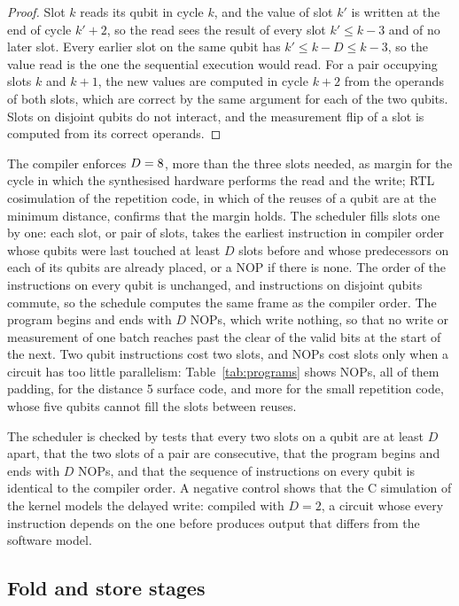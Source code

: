 \begin{proof}
Slot $k$ reads its qubit in cycle $k$, and the value of slot $k'$ is written at the end of cycle $k'+2$, so the read
sees the result of every slot $k'\le k-3$ and of no later slot. Every earlier slot on the same qubit has $k'\le k-D\le
k-3$, so the value read is the one the sequential execution would read. For a pair occupying slots $k$ and $k+1$, the
new values are computed in cycle $k+2$ from the operands of both slots, which are correct by the same argument for
each of the two qubits. Slots on disjoint qubits do not interact, and the measurement flip of a slot is computed from
its correct operands.
\end{proof}

The compiler enforces $D=8$, more than the three slots needed, as margin for the cycle in which the
synthesised hardware performs the read and the write; RTL cosimulation of the repetition code, in which \NumRepReusesAtD{} of the \NumRepReuses{} reuses
of a qubit are at the minimum distance, confirms that the margin holds. The scheduler fills slots one by one: each slot, or pair of
slots, takes the earliest instruction in compiler order whose qubits were last touched at least $D$ slots before and
whose predecessors on each of its qubits are already placed, or a NOP if there is none. The order of the instructions
on every qubit is unchanged, and instructions on disjoint qubits commute, so the schedule computes the same frame as
the compiler order. The program begins and ends with $D$ NOPs, which write nothing, so that no write or measurement of
one batch reaches past the clear of the valid bits at the start of the next. Two qubit instructions cost two slots,
and NOPs cost slots only when a circuit has too little parallelism: Table~\ref{tab:programs} shows
\NumNopsSurfFive{} NOPs, all of them padding, for the distance 5 surface code, and more for the small repetition
code, whose five qubits cannot fill the slots between reuses.

The scheduler is checked by tests that every two slots on a qubit are at least $D$ apart, that the two slots of a
pair are consecutive, that the program begins and ends with $D$ NOPs, and that the sequence of instructions on every
qubit is identical to the compiler order. A negative control shows that the C simulation of the kernel models the
delayed write: compiled with $D=2$, a circuit whose every instruction depends on the one before produces output that
differs from the software model.

\subsection{Fold and store stages}\label{sec:fold}

